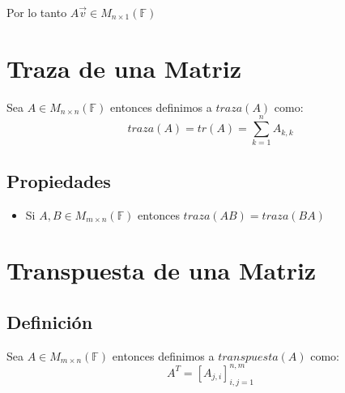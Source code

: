 \documentclass[12pt, fleqn]{report}                             %
\newcommand{\Brackets}[1]{\left[ #1 \right]}                    %
\begin{document}
                Por lo tanto $A\vec{v} \in M_{n \times 1}(\mathbb{F})$



        \clearpage
        \section{Traza de una Matriz}

            Sea $A \in M_{n \times n}(\mathbb{F})$ entonces definimos a $traza(A)$ como:
            \begin{equation}
                traza(A) = tr(A) = \sum_{k=1}^{n} A_{k, k}
            \end{equation}


            \subsection{Propiedades}

                \begin{itemize}
                    \item Si $A, B \in M_{m \times n}(\mathbb{F})$ entonces $traza(AB) = traza(BA)$
                \end{itemize}




        \clearpage
        \section{Transpuesta de una Matriz}

            \subsection{Definición}

                Sea $A \in M_{m \times n}(\mathbb{F})$ entonces definimos a $transpuesta(A)$ como:
                \begin{equation}
                    A^T = \Brackets{ A_{j, i} }_{i, j = 1}^{n, m}
                \end{equation}
\end{document}
